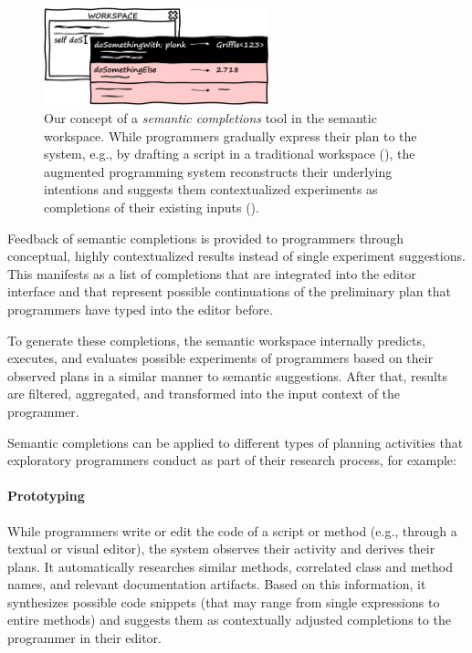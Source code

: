 \begin{figure}
	\centering
	\includegraphics[width=0.58\textwidth]{02_workspace/completions.png}
	\caption[Our concept of a \emph{semantic completions} tool in the semantic workspace.]{
		Our concept of a \emph{semantic completions} tool in the semantic workspace.
		While programmers gradually express their plan to the system, e.g., by drafting a script in a traditional workspace (\bold{\textcolor{gray}{gray}}), the augmented programming system reconstructs their underlying intentions and suggests them contextualized experiments as completions of their existing inputs (\bold{\textcolor[HTML]{c00000}{red}}).
	}
	\label{fig:approach/workspace/completions}
\end{figure}

Feedback of semantic completions is provided to programmers through conceptual, highly contextualized results instead of single experiment suggestions.
This manifests as a list of completions that are integrated into the editor interface and that represent possible continuations of the preliminary plan that programmers have typed into the editor before.

To generate these completions, the semantic workspace internally predicts, executes, and evaluates possible experiments of programmers based on their observed plans in a similar manner to semantic suggestions.
After that, results are filtered, aggregated, and transformed into the input context of the programmer.

Semantic completions can be applied to different types of planning activities that exploratory programmers conduct as part of their research process, for example:

\paragraph{Prototyping}
While programmers write or edit the code of a script or method (e.g., through a textual or visual editor), the system observes their activity and derives their plans.
It automatically researches similar methods, correlated class and method names, and relevant documentation artifacts.
Based on this information, it synthesizes possible code snippets (that may range from single expressions to entire methods) and suggests them as contextually adjusted completions to the programmer in their editor.

